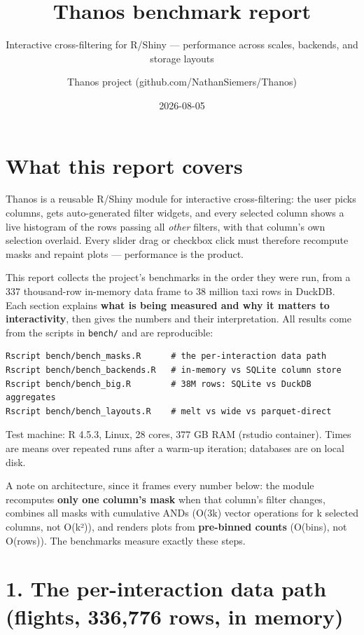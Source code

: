 \documentclass[
  11pt,
]{article}
\title{Thanos benchmark report}
\subtitle{Interactive cross-filtering for R/Shiny --- performance across
scales, backends, and storage layouts}
\author{Thanos project (github.com/NathanSiemers/Thanos)}
\date{2026-08-05}
\begin{document}
\maketitle

{
\setcounter{tocdepth}{2}
\tableofcontents
}
\section{What this report covers}\label{what-this-report-covers}

Thanos is a reusable R/Shiny module for interactive cross-filtering: the
user picks columns, gets auto-generated filter widgets, and every
selected column shows a live histogram of the rows passing all
\emph{other} filters, with that column's own selection overlaid. Every
slider drag or checkbox click must therefore recompute masks and repaint
plots --- performance is the product.

This report collects the project's benchmarks in the order they were
run, from a 337 thousand-row in-memory data frame to 38 million taxi
rows in DuckDB. Each section explains \textbf{what is being measured and
why it matters to interactivity}, then gives the numbers and their
interpretation. All results come from the scripts in \texttt{bench/} and
are reproducible:

\begin{verbatim}
Rscript bench/bench_masks.R      # the per-interaction data path
Rscript bench/bench_backends.R   # in-memory vs SQLite column store
Rscript bench/bench_big.R        # 38M rows: SQLite vs DuckDB aggregates
Rscript bench/bench_layouts.R    # melt vs wide vs parquet-direct
\end{verbatim}

Test machine: R 4.5.3, Linux, 28 cores, 377 GB RAM (rstudio container).
Times are means over repeated runs after a warm-up iteration; databases
are on local disk.

A note on architecture, since it frames every number below: the module
recomputes \textbf{only one column's mask} when that column's filter
changes, combines all masks with cumulative ANDs (O(3k) vector
operations for k selected columns, not O(k²)), and renders plots from
\textbf{pre-binned counts} (O(bins), not O(rows)). The benchmarks
measure exactly these steps.

\section{1. The per-interaction data path (flights, 336,776 rows, in
memory)}\label{the-per-interaction-data-path-flights-336776-rows-in-memory}
\end{document}
